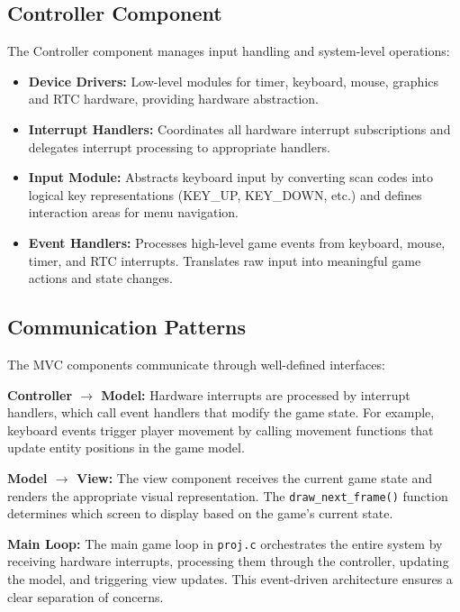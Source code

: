 \documentclass[12pt,a4paper]{article}
\begin{document}
\subsection{Controller Component}

The Controller component manages input handling and system-level operations:

\begin{itemize}[itemsep=0.5em]
  \item \textbf{Device Drivers:} Low-level modules for timer, keyboard, mouse, graphics and RTC hardware, providing hardware abstraction.
  \item \textbf{Interrupt Handlers:} Coordinates all hardware interrupt subscriptions and delegates interrupt processing to appropriate handlers.
  \item \textbf{Input Module:} Abstracts keyboard input by converting scan codes into logical key representations (KEY\_UP, KEY\_DOWN, etc.) and defines interaction areas for menu navigation.
  \item \textbf{Event Handlers:} Processes high-level game events from keyboard, mouse, timer, and RTC interrupts. Translates raw input into meaningful game actions and state changes.
\end{itemize}

\subsection{Communication Patterns}

The MVC components communicate through well-defined interfaces:

\textbf{Controller $\rightarrow$ Model:} Hardware interrupts are processed by interrupt handlers, which call event handlers that modify the game state. For example, keyboard events trigger player movement by calling movement functions that update entity positions in the game model.

\textbf{Model $\rightarrow$ View:} The view component receives the current game state and renders the appropriate visual representation. The \texttt{draw\_next\_frame()} function determines which screen to display based on the game's current state.

\textbf{Main Loop:} The main game loop in \texttt{proj.c} orchestrates the entire system by receiving hardware interrupts, processing them through the controller, updating the model, and triggering view updates. This event-driven architecture ensures a clear separation of concerns.
\end{document}
